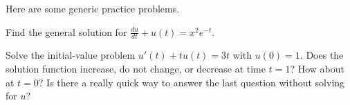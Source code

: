 \documentclass[../main.tex]{subfiles}
\begin{document}
Here are some generic practice problems.
\begin{example}
  Find the general solution for \(\frac{du}{dt} + u(t) = x^{2}e^{-t}\).
\end{example}
\clearpage

\begin{example}
  Solve the initial-value problem \(u'(t) + tu(t) = 3t\) with \(u(0) = 1\).  Does the solution function increase, do not change, or decrease at time \(t = 1\)? How about at \(t = 0\)? Is there a really quick way to answer the last question without solving for \(u\)?
\end{example}
\clearpage
\end{document}
